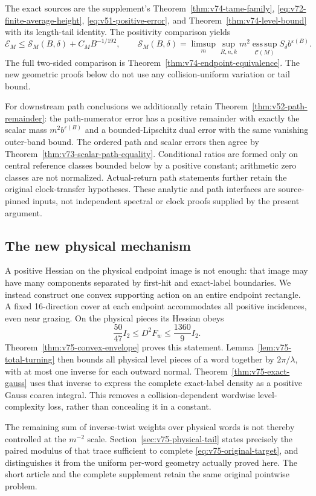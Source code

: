 \documentclass[11pt,reqno]{amsart}
\numberwithin{equation}{section}
\theoremstyle{definition}\newtheorem{definition}[theorem]{Definition}
\theoremstyle{remark}\newtheorem{remark}[theorem]{Remark}
\theoremstyle{definition}\newtheorem{inputstatement}[theorem]{Input statement}
\newcommand{\esssup}{\operatorname*{ess\,sup}}
\begin{document}
The exact sources are the supplement's
Theorem~\ref{thm:v74-tame-family},
\eqref{eq:v72-finite-average-height},
\eqref{eq:v51-positive-error}, and
Theorem~\ref{thm:v74-level-bound} with its length-tail identity.
The positivity comparison yields
\[
 \mathcal E_M\le\mathcal S_M(B,\delta)+C_MB^{-1/192},\qquad
 \mathcal S_M(B,\delta)=\limsup_m\sup_{R,n,k}m^2
                           \esssup_{\mathcal C(M)}S_\delta b^{\varepsilon(B)}.
\]
The full two-sided comparison is
Theorem~\ref{thm:v74-endpoint-equivalence}. The new geometric
proofs below do not use any collision-uniform variation or tail bound.

For downstream path conclusions we additionally retain
Theorem~\ref{thm:v52-path-remainder}: the path-numerator error has
a positive remainder with exactly the scalar mass $m^2b^{\varepsilon(B)}$
and a bounded-Lipschitz dual error with the same vanishing outer-band
bound. The ordered path and scalar errors then agree by
Theorem~\ref{thm:v73-scalar-path-equality}. Conditional ratios are
formed only on central reference classes bounded below by a positive
constant; arithmetic zero classes are not normalized. Actual-return
path statements further retain the original clock-transfer hypotheses.
These analytic and path interfaces are source-pinned inputs, not
independent spectral or clock proofs supplied by the present argument.

\subsection{The new physical mechanism}
A positive Hessian on the physical endpoint image is not enough:
that image may have many components separated by first-hit and
exact-label boundaries. We instead construct one convex supporting
action on an entire endpoint rectangle. A fixed 16-direction cover
at each endpoint accommodates all positive incidences, even near
grazing. On the physical pieces its Hessian obeys
\[
            \frac{50}{47}I_2\le D^2F_w\le\frac{1360}{9}I_2.
\]
Theorem~\ref{thm:v75-convex-envelope} proves this statement.
Lemma~\ref{lem:v75-total-turning} then bounds all physical level
pieces of a word together by $2\pi/\lambda$, with at most one
inverse for each outward normal. Theorem~\ref{thm:v75-exact-gauss}
uses that inverse to express the complete exact-label density as a
positive Gauss coarea integral. This removes a collision-dependent
wordwise level-complexity loss, rather than concealing it in a
constant.

The remaining sum of inverse-twist weights over physical words is
not thereby controlled at the $m^{-2}$ scale. Section~\ref{sec:v75-physical-tail}
states precisely the paired modulus of that trace sufficient to
complete \eqref{eq:v75-original-target}, and distinguishes it from
the uniform per-word geometry actually proved here. The short
article and the complete supplement retain the same original
pointwise problem.
\end{document}
